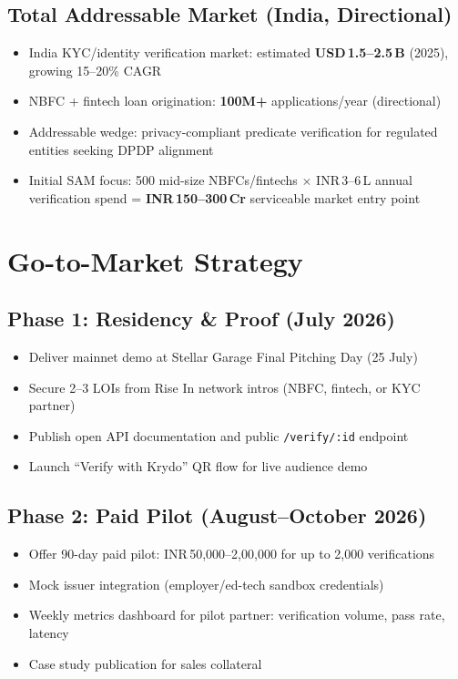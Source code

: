 \documentclass[11pt,a4paper]{article}
\newcommand{\krydo}{\textsf{Krydo}}
\begin{document}
\subsection{Total Addressable Market (India, Directional)}

\begin{itemize}
  \item India KYC/identity verification market: estimated \textbf{USD\,1.5--2.5\,B} (2025), growing 15--20\% CAGR
  \item NBFC + fintech loan origination: \textbf{100M+} applications/year (directional)
  \item Addressable wedge: privacy-compliant predicate verification for regulated entities seeking DPDP alignment
  \item Initial SAM focus: 500 mid-size NBFCs/fintechs $\times$ INR\,3--6\,L annual verification spend = \textbf{INR\,150--300\,Cr} serviceable market entry point
\end{itemize}

\section{Go-to-Market Strategy}

\subsection{Phase 1: Residency \& Proof (July 2026)}

\begin{itemize}
  \item Deliver mainnet demo at Stellar Garage Final Pitching Day (25 July)
  \item Secure 2--3 LOIs from Rise In network intros (NBFC, fintech, or KYC partner)
  \item Publish open API documentation and public \texttt{/verify/:id} endpoint
  \item Launch ``Verify with \krydo{}'' QR flow for live audience demo
\end{itemize}

\subsection{Phase 2: Paid Pilot (August--October 2026)}

\begin{itemize}
  \item Offer 90-day paid pilot: INR\,50,000--2,00,000 for up to 2,000 verifications
  \item Mock issuer integration (employer/ed-tech sandbox credentials)
  \item Weekly metrics dashboard for pilot partner: verification volume, pass rate, latency
  \item Case study publication for sales collateral
\end{itemize}
\end{document}
